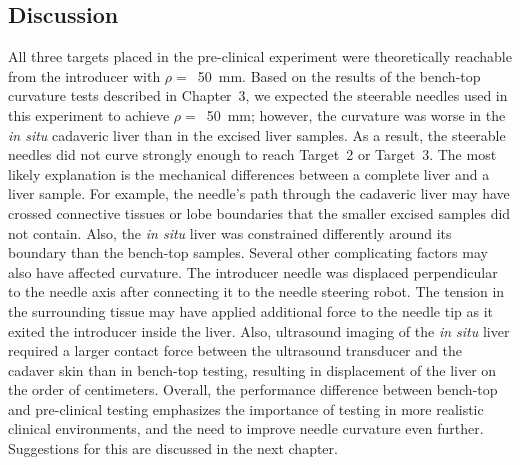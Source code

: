 \subsection{Discussion}
All three targets placed in the pre-clinical experiment were theoretically reachable from the introducer with $\rho =$~50~mm. Based on the results of the bench-top curvature tests described in Chapter~3, we expected the steerable needles used in this experiment to achieve $\rho =$~50~mm; however, the curvature was worse in the \textit{in situ} cadaveric liver than in the excised liver samples. As a result, the steerable needles did not curve strongly enough to reach Target~2 or Target~3. The most likely explanation is the mechanical differences between a complete liver and a liver sample. For example, the needle's path through the cadaveric liver may have crossed connective tissues or lobe boundaries that the smaller excised samples did not contain. Also, the \textit{in situ} liver was constrained differently around its boundary than the bench-top samples. Several other complicating factors may also have affected curvature. The introducer needle was displaced perpendicular to the needle axis after connecting it to the needle steering robot. The tension in the surrounding tissue may have applied additional force to the needle tip as it exited the introducer inside the liver. Also, ultrasound imaging of the \textit{in situ} liver required a larger contact force between the ultrasound transducer and the cadaver skin than in bench-top testing, resulting in displacement of the liver on the order of centimeters. Overall, the performance difference between bench-top and pre-clinical testing emphasizes the importance of testing in more realistic clinical environments, and the need to improve needle curvature even further. Suggestions for this are discussed in the next chapter.

